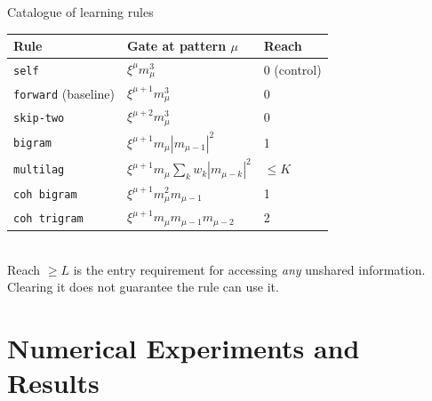 \documentclass[aspectratio=169]{beamer}
\newcommand{\xxi}{\xi}
\newcommand{\mvar}{m}
\begin{document}
\begin{frame}{Catalogue of learning rules}
  \centering
  \small
  \begin{tabular}{lll}
    \toprule
    Rule & Gate at pattern $\mu$ & Reach \\
    \midrule
    \texttt{self} & $\xxi^\mu \mvar_\mu^3$ & 0 (control) \\
    \texttt{forward} (baseline) & $\xxi^{\mu+1} \mvar_\mu^3$ & 0 \\
    \texttt{skip-two} & $\xxi^{\mu+2} \mvar_\mu^3$ & 0 \\
    \texttt{bigram} & $\xxi^{\mu+1} \mvar_\mu |\mvar_{\mu-1}|^2$ & 1 \\
    \texttt{multilag} & $\xxi^{\mu+1} \mvar_\mu \sum_k w_k |\mvar_{\mu-k}|^2$ & $\le K$ \\
    \texttt{coh bigram} & $\xxi^{\mu+1} \mvar_\mu^2 \mvar_{\mu-1}$ & 1 \\
    \texttt{coh trigram} & $\xxi^{\mu+1} \mvar_\mu \mvar_{\mu-1} \mvar_{\mu-2}$ & 2 \\
    \bottomrule
  \end{tabular}
  \\[3mm]
  {\small Reach $\ge L$ is the entry requirement for accessing \emph{any} unshared
  information. Clearing it does not guarantee the rule can use it.}
\end{frame}


\section[Results]{Numerical Experiments and Results}
\end{document}
